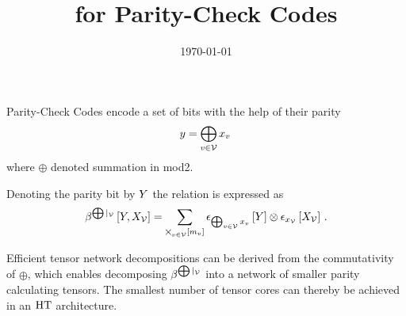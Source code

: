 \documentclass[aps,onecolumn,nofootinbib,pra]{article}
\begin{document}
    \title{\tnreason for Parity-Check Codes}

    \maketitle
    \date{\today}

    Parity-Check Codes encode a set of bits with the help of their parity
    \begin{align*}
        y = \bigoplus_{v\in\mathcal{V}} x_{v} \,
    \end{align*}
    where $\oplus$ denoted summation in mod2.

    Denoting the parity bit by $Y$ the relation is expressed as
    \begin{align*}
        \beta^{\bigoplus|_{\mathcal{V}}}\left[Y,X_{\mathcal{V}}\right]
        = \sum_{\bigtimes_{v\in\mathcal{V}}[m_{v}]} \epsilon_{\bigoplus_{v\in\mathcal{V}} x_{v}}\left[Y\right]
        \otimes \epsilon_{x_{\mathcal{V}}}\left[X_{\mathcal{V}}\right] \, .
    \end{align*}

    Efficient tensor network decompositions can be derived from the commutativity of $\oplus$, which enables decomposing $\beta^{\bigoplus|_{\mathcal{V}}}$ into a network of smaller parity calculating tensors.
    The smallest number of tensor cores can thereby be achieved in an $\mathrm{HT}$ architecture.
\end{document}
